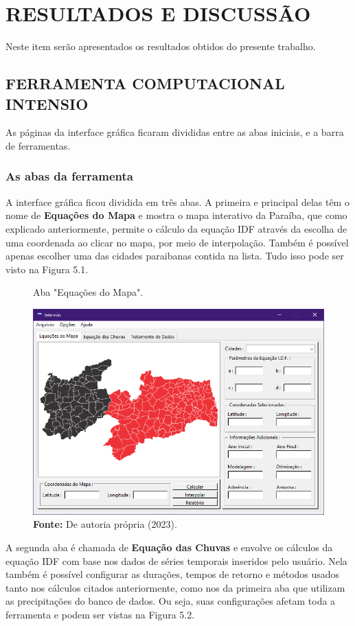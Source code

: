\chapter{RESULTADOS E DISCUSSÃO}

Neste item serão apresentados os resultados obtidos do presente trabalho.

\section{FERRAMENTA COMPUTACIONAL INTENSIO}

As páginas da interface gráfica ficaram divididas entre as abas iniciais, e a barra de ferramentas.

\subsection{As abas da ferramenta}

A interface gráfica ficou dividida em três abas. A primeira e principal delas têm o nome de \textbf{Equações do Mapa} e mostra o mapa interativo da Paraíba, que como explicado anteriormente, permite o cálculo da equação IDF através da escolha de uma coordenada ao clicar no mapa, por meio de interpolação. Também é possível apenas escolher uma das cidades paraibanas contida na lista. Tudo isso pode ser visto na Figura 5.1.\bigskip

\begin{figure}[!ht]
	\centering
	\caption{Aba "Equações do Mapa".}
	\includegraphics[width=.7625\linewidth]{figuras/equacoes_do_mapa.png}
	\caption*{\textbf{Fonte:} De autoria própria (2023).}
	\label{fig:equacoes_do_mapa.png}
\end{figure}

 A segunda aba é chamada de \textbf{Equação das Chuvas} e envolve os cálculos da equação IDF com base nos dados de séries temporais inseridos pelo usuário. Nela também é possível configurar as durações, tempos de retorno e métodos usados tanto nos cálculos citados anteriormente, como nos da primeira aba que utilizam as precipitações do banco de dados. Ou seja, suas configurações afetam toda a ferramenta e podem ser vistas na Figura 5.2.

